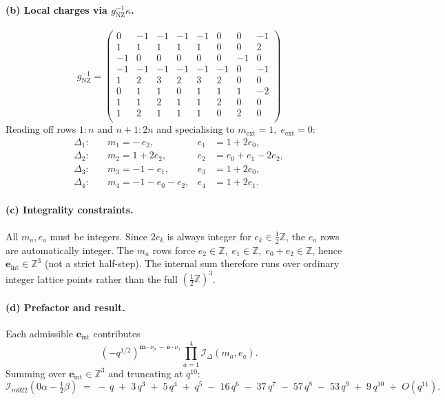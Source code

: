 \documentclass[11pt,a4paper]{article}
\renewcommand{\Im}{\mathcal{I}_{m022}}                %
\newcommand{\IDelta}{\mathcal{I}_{\Delta}}            %
\newcommand{\Zhalf}{\tfrac{1}{2}\mathbb{Z}}
\newcommand{\tet}[1]{\Delta_{#1}}
\begin{document}
\paragraph{(b) Local charges via \(g_{\text{NZ}}^{-1}\kappa\).}
\[
g_{\text{NZ}}^{-1} =
\left(\begin{array}{rrrr|rrrr}
 0 & -1 & -1 & -1 & -1 &  0 &  0 & -1 \\
 1 &  1 &  1 &  1 &  1 &  0 &  0 &  2 \\
-1 &  0 &  0 &  0 &  0 &  0 & -1 &  0 \\
-1 & -1 & -1 & -1 & -1 & -1 &  0 & -1 \\ \hline
 1 &  2 &  3 &  2 &  3 &  2 &  0 &  0 \\
 0 &  1 &  1 &  0 &  1 &  1 &  1 & -2 \\
 1 &  1 &  2 &  1 &  1 &  2 &  0 &  0 \\
 1 &  2 &  1 &  1 &  1 &  0 &  2 &  0 \\
\end{array}\right)
\]
Reading off rows \(1{:}n\) and \(n{+}1{:}2n\) and specialising to
\(m_{\text{ext}}=1,\; e_{\text{ext}}=0\):
\begin{align*}
\tet{1}:\quad & m_1 = -\,e_2, & e_1 &= 1 + 2e_0, \\
\tet{2}:\quad & m_2 = 1 + 2e_2, & e_2 &= e_0 + e_1 - 2e_2, \\
\tet{3}:\quad & m_3 = -1 - e_1, & e_3 &= 1 + 2e_0, \\
\tet{4}:\quad & m_4 = -1 - e_0 - e_2, & e_4 &= 1 + 2e_1.
\end{align*}

\paragraph{(c) Integrality constraints.}
All \(m_a, e_a\) must be integers.  Since \(2e_k\) is always integer
for \(e_k\in\Zhalf\), the \(e_a\) rows are automatically integer.
The \(m_a\) rows force
\(e_2 \in \mathbb{Z},\; e_1 \in \mathbb{Z},\;
  e_0 + e_2 \in \mathbb{Z}\),
hence \(\mathbf{e}_{\text{int}} \in \mathbb{Z}^3\) (not a strict
half-step).  The internal sum therefore runs over ordinary integer
lattice points rather than the full \((\Zhalf)^3\).

\paragraph{(d) Prefactor and result.}
Each admissible \(\mathbf{e}_{\text{int}}\) contributes
\[
(-q^{1/2})^{\mathbf{m}\cdot\nu_p \,-\, \mathbf{e}\cdot\nu_x}
\prod_{a=1}^{4} \IDelta(m_a, e_a).
\]
Summing over \(\mathbf{e}_{\text{int}} \in \mathbb{Z}^3\) and truncating
at \(q^{10}\):
\[
\Im\!\left(0\alpha - \tfrac{1}{2}\beta\right) \;=\;
  -\,q \;+\; 3\,q^{3} \;+\; 5\,q^{4} \;+\; q^{5}
  \;-\; 16\,q^{6} \;-\; 37\,q^{7} \;-\; 57\,q^{8}
  \;-\; 53\,q^{9} \;+\; 9\,q^{10}
  \;+\; O(q^{11}).
\]
\end{document}
